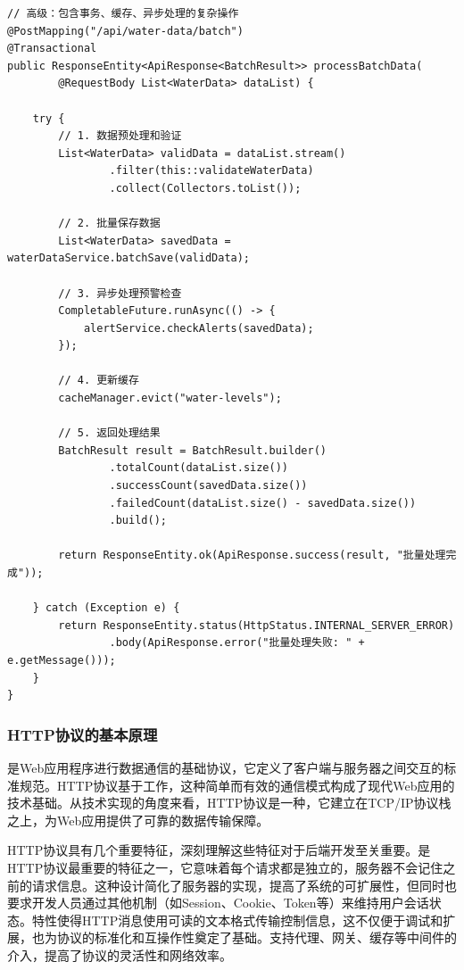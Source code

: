 \begin{lstlisting}[style=java]
// 高级：包含事务、缓存、异步处理的复杂操作
@PostMapping("/api/water-data/batch")
@Transactional
public ResponseEntity<ApiResponse<BatchResult>> processBatchData(
        @RequestBody List<WaterData> dataList) {
    
    try {
        // 1. 数据预处理和验证
        List<WaterData> validData = dataList.stream()
                .filter(this::validateWaterData)
                .collect(Collectors.toList());
        
        // 2. 批量保存数据
        List<WaterData> savedData = waterDataService.batchSave(validData);
        
        // 3. 异步处理预警检查
        CompletableFuture.runAsync(() -> {
            alertService.checkAlerts(savedData);
        });
        
        // 4. 更新缓存
        cacheManager.evict("water-levels");
        
        // 5. 返回处理结果
        BatchResult result = BatchResult.builder()
                .totalCount(dataList.size())
                .successCount(savedData.size())
                .failedCount(dataList.size() - savedData.size())
                .build();
        
        return ResponseEntity.ok(ApiResponse.success(result, "批量处理完成"));
        
    } catch (Exception e) {
        return ResponseEntity.status(HttpStatus.INTERNAL_SERVER_ERROR)
                .body(ApiResponse.error("批量处理失败: " + e.getMessage()));
    }
}
\end{lstlisting}

\hypertarget{httpux534fux8baeux7684ux57faux672cux539fux7406}{%
\subsubsection{HTTP协议的基本原理}\label{httpux534fux8baeux7684ux57faux672cux539fux7406}}

是Web应用程序进行数据通信的基础协议，它定义了客户端与服务器之间交互的标准规范。HTTP协议基于工作，这种简单而有效的通信模式构成了现代Web应用的技术基础。从技术实现的角度来看，HTTP协议是一种，它建立在TCP/IP协议栈之上，为Web应用提供了可靠的数据传输保障。

HTTP协议具有几个重要特征，深刻理解这些特征对于后端开发至关重要。是HTTP协议最重要的特征之一，它意味着每个请求都是独立的，服务器不会记住之前的请求信息。这种设计简化了服务器的实现，提高了系统的可扩展性，但同时也要求开发人员通过其他机制（如Session、Cookie、Token等）来维持用户会话状态。特性使得HTTP消息使用可读的文本格式传输控制信息，这不仅便于调试和扩展，也为协议的标准化和互操作性奠定了基础。支持代理、网关、缓存等中间件的介入，提高了协议的灵活性和网络效率。

